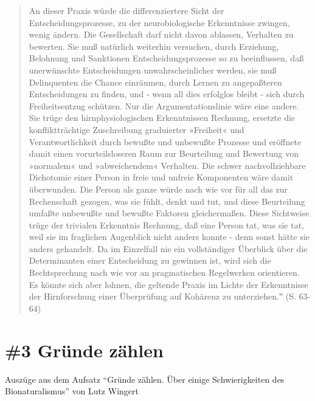 \documentclass[
  a4paper,
]{report}
\begin{document}
\begin{quote}
An dieser Praxis würde die differenziertere Sicht der Entscheidungsprozesse, zu der neurobiologische Erkenntnisse zwingen, wenig ändern. Die Gesellschaft darf nicht davon ablassen, Verhalten zu bewerten. Sie muß natürlich weiterhin versuchen, durch Erziehung, Belohnung und Sanktionen Entscheidungsprozesse so zu beeinflussen, daß unerwünschte Entscheidungen unwahrscheinlicher werden, sie muß Delinquenten die Chance einräumen, durch Lernen zu angepaßteren Entscheidungen zu finden, und - wenn all dies erfolglos bleibt - sich durch Freiheitsentzug schützen. Nur die Argumentationslinie wäre eine andere. Sie trüge den hirnphysiologischen Erkenntnissen Rechnung, ersetzte die konfliktträchtige Zuschreibung graduierter »Freiheit« und Verantwortlichkeit durch bewußte und unbewußte Prozesse und eröffnete damit einen vorurteilsloseren Raum zur Beurteilung und Bewertung von »normalem« und »abweichendem« Verhalten. Die schwer nachvollziehbare Dichotomie einer Person in freie und unfreie Komponenten wäre damit überwunden. Die Person als ganze würde nach wie vor für all das zur Rechenschaft gezogen, was sie fühlt, denkt und tut, und diese Beurteilung umfaßte unbewußte und bewußte Faktoren gleichermaßen. Diese Sichtweise trüge der trivialen Erkenntnis Rechnung, daß eine Person tat, was sie tat, weil sie im fraglichen Augenblick nicht anders konnte - denn sonst hätte sie anders gehandelt. Da im Einzelfall nie ein vollständiger Überblick über die Determinanten einer Entscheidung zu gewinnen ist, wird sich die Rechtsprechung nach wie vor an pragmatischen Regelwerken orientieren. Es könnte sich aber lohnen, die geltende Praxis im Lichte der Erkenntnisse der Hirnforschung einer Überprüfung auf Kohärenz zu unterziehen.‟ (S. 63-64)
\end{quote}

\hypertarget{pr-ev3}{%
\section{\#3 Gründe zählen}\label{pr-ev3}}

Auszüge aus dem Aufsatz ``Gründe zählen. Über einige Schwierigkeiten des Bionaturalismus'' von Lutz Wingert \citeyearpar{Lutz2004}
\end{document}
